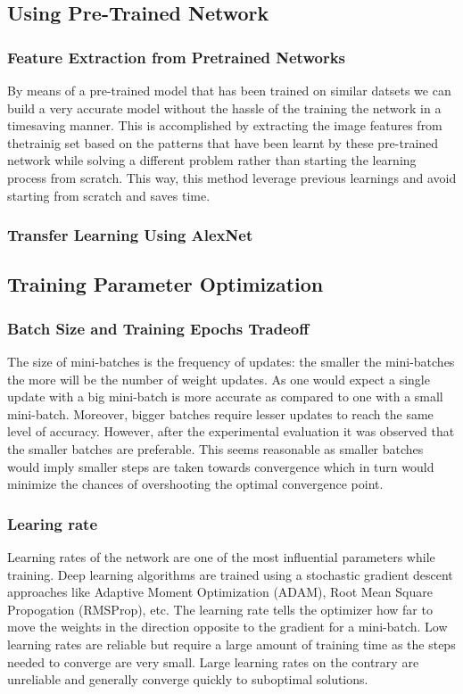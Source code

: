 \documentclass[doc/report.tex]{subfiles}
\begin{document}
\subsection{Using Pre-Trained Network}
\subsubsection{Feature Extraction from Pretrained Networks}
By means of a pre-trained model that has been trained on similar datsets we can build a very accurate model without the hassle of the training the network in a timesaving manner. This is accomplished by extracting the image features from thetrainig set based on the patterns that have been learnt by these pre-trained network while solving a different problem rather than starting the learning process from scratch. This way, this method leverage previous learnings and avoid starting from scratch and saves time.  

\subsubsection{Transfer Learning Using AlexNet}

\subsection{Training Parameter Optimization}
\subsubsection{Batch Size and Training Epochs Tradeoff}
The size of mini-batches is the frequency of updates: the smaller the mini-batches the more will be the number of weight updates. As one would expect a single update with a big mini-batch is more accurate as compared to one with a small mini-batch. Moreover, bigger batches require lesser updates to reach the same level of accuracy. However, after the experimental evaluation it was observed that the smaller batches are preferable. This seems reasonable as smaller batches would imply smaller steps are taken towards convergence which in turn would minimize the chances of overshooting the optimal convergence point.

\subsubsection{Learing rate}
Learning rates of the network are one of the most influential parameters while training. Deep learning algorithms are trained using a stochastic gradient descent approaches like Adaptive Moment Optimization (ADAM), Root Mean Square Propogation (RMSProp), etc. The learning rate tells the optimizer how far to move the weights in the direction opposite to the gradient for a mini-batch. Low learning rates are reliable but require a large amount of training time as the steps needed to converge are very small. Large learning rates on the contrary are unreliable and generally converge quickly to suboptimal solutions.
\end{document}
